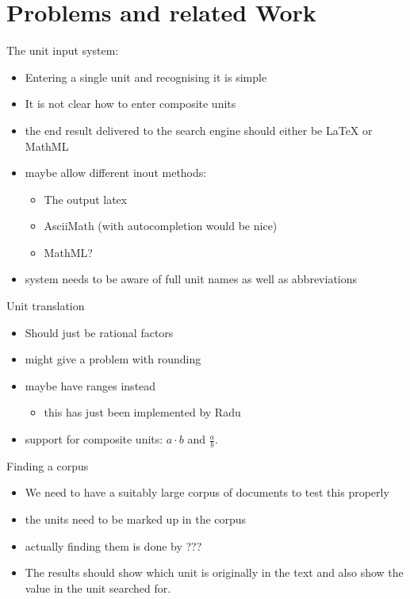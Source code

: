 \documentclass[11pt]{article}
\begin{document}

\section{Problems and related Work}
\label{sec:problems_relatedwork}

The unit input system:
\begin{itemize}
  \item Entering a single unit and recognising it is simple
  \item It is not clear how to enter composite units
  \item the end result delivered to the search engine should either be LaTeX or MathML
  \item maybe allow different inout methods:
  \begin{itemize}
    \item The output latex
    \item AsciiMath (with autocompletion would be nice)
    \item MathML?
  \end{itemize}
  \item system needs to be aware of full unit names as well as abbreviations
\end{itemize}

Unit translation
\begin{itemize}
  \item Should just be rational factors
  \item might give a problem with rounding
  \item maybe have ranges instead
  \begin{itemize}
    \item this has just been implemented by Radu 
  \end{itemize}
  \item support for composite units: $a \cdot{} b$ and $\frac{a}{b}$.
\end{itemize}

Finding a corpus
\begin{itemize}
  \item We need to have a suitably large corpus of documents to test this properly
  \item the units need to be marked up in the corpus
  \item actually finding them is done by ??? 
  \item The results should show which unit is originally in the text and also show the value in the unit searched for.
\end{itemize}


\end{document}

